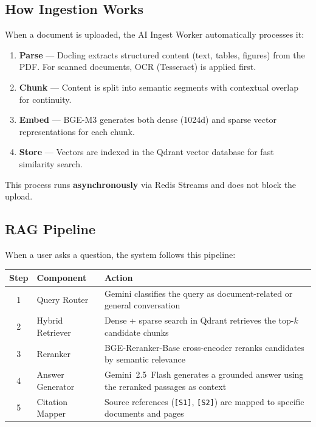 \subsection{How Ingestion Works}

When a document is uploaded, the AI Ingest Worker automatically
processes it:

\begin{enumerate}[leftmargin=18pt]
  \item \textbf{Parse} --- Docling extracts structured content
        (text, tables, figures) from the PDF. For scanned
        documents, OCR (Tesseract) is applied first.
  \item \textbf{Chunk} --- Content is split into semantic
        segments with contextual overlap for continuity.
  \item \textbf{Embed} --- BGE-M3 generates both dense (1024d)
        and sparse vector representations for each chunk.
  \item \textbf{Store} --- Vectors are indexed in the Qdrant
        vector database for fast similarity search.
\end{enumerate}

This process runs \textbf{asynchronously} via Redis Streams
and does not block the upload.

\subsection{RAG Pipeline}

When a user asks a question, the system follows this pipeline:

\begin{tabularx}{\textwidth}{@{} c l X @{}}
  \toprule
  \textbf{Step} & \textbf{Component}
    & \textbf{Action} \\
  \midrule
  1 & Query Router
    & Gemini classifies the query as document-related
      or general conversation \\
  2 & Hybrid Retriever
    & Dense + sparse search in Qdrant retrieves
      the top-$k$ candidate chunks \\
  3 & Reranker
    & BGE-Reranker-Base cross-encoder reranks candidates
      by semantic relevance \\
  4 & Answer Generator
    & Gemini~2.5~Flash generates a grounded answer using
      the reranked passages as context \\
  5 & Citation Mapper
    & Source references (\texttt{[S1]}, \texttt{[S2]})
      are mapped to specific documents and pages \\
  \bottomrule
\end{tabularx}


